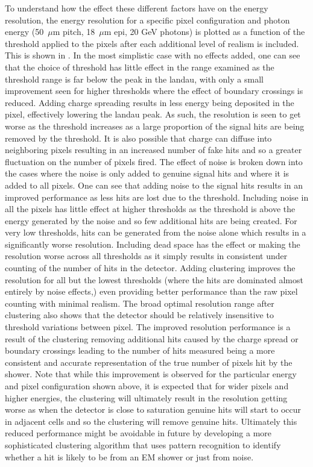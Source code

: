 To understand how the effect these different factors have on the energy resolution, the energy resolution for a specific pixel configuration and photon energy (50~$\mu$m pitch, 18~$\mu$m epi, 20 GeV photons) is plotted as a function of the threshold applied to the pixels after each additional level of realism is included. This is shown in . In the most simplistic case with no effects added, one can see that the choice of threshold has little effect in the range examined as the threshold range is far below the peak in the landau, with only a small improvement seen for higher thresholds where the effect of boundary crossings is reduced. Adding charge spreading results in less energy being deposited in the pixel, effectively lowering the landau peak. As such, the resolution is seen to get worse as the threshold increases as a large proportion of the signal hits are being removed by the threshold. It is also possible that charge can diffuse into neighboring pixels resulting in an increased number of fake hits and so a greater fluctuation on the number of pixels fired. The effect of noise is broken down into the cases where the noise is only added to genuine signal hits and where it is added to all pixels. One can see that adding noise to the signal hits results in an improved performance as less hits are lost due to the threshold. Including noise in all the pixels has little effect at higher thresholds as the threshold is above the energy generated by the noise and so few additional hits are being created. For very low thresholds, hits can be generated from the noise alone which results in a significantly worse resolution. Including dead space has the effect or making the resolution worse across all thresholds as it simply results in consistent under counting of the number of hits in the detector. Adding clustering improves the resolution for all but the lowest thresholds (where the hits are dominated almost entirely by noise effects,) even providing better performance than the raw pixel counting with minimal realism. The broad optimal resolution range after clustering also shows that the detector should be relatively insensitive to threshold variations between pixel. The improved resolution performance is a result of the clustering removing additional hits caused by the charge spread or boundary crossings leading to the number of hits measured being a more consistent and accurate representation of the true number of pixels hit by the shower. Note that while this improvement is observed for the particular energy and pixel configuration shown above, it is expected that for wider pixels and higher energies, the clustering will ultimately result in the resolution getting worse as when the detector is close to saturation genuine hits will start to occur in adjacent cells and so the clustering will remove genuine hits. Ultimately this reduced performance might be avoidable in future by developing a more sophisticated clustering algorithm that uses pattern recognition to identify whether a hit is likely to be from an EM shower or just from noise.


